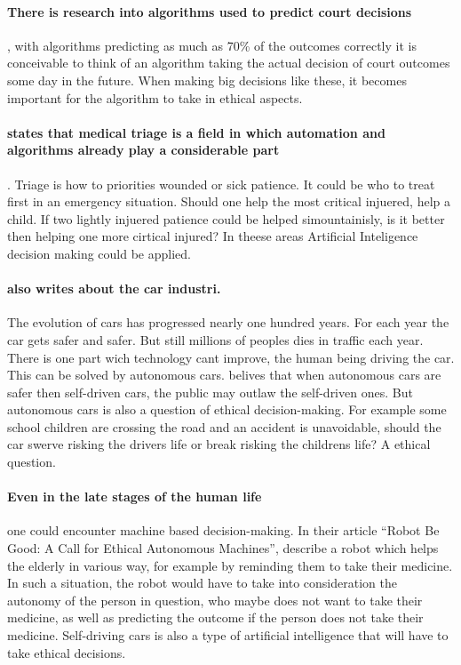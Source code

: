 \documentclass[11pt]{article}
\begin{document}
\paragraph{There is research into algorithms used to predict court decisions}
\cite{martin2004competing}, with algorithms predicting as much
as 70\% of the outcomes correctly \cite{Kravets2014Court} it is
conceivable to think of an algorithm taking the actual decision of court
outcomes some day in the future. When making big decisions like these, it
becomes important for the algorithm to take in ethical aspects.

\paragraph{ states that medical triage is a field in which automation and algorithms already play a considerable part}. Triage is how to priorities wounded or sick patience. It could be who to treat first in an emergency situation. Should one help the most critical injuered, help a child. If two lightly injuered patience could be helped simountainisly, is it better then helping one more cirtical injured? In theese areas Artificial Inteligence decision making could be applied.

\paragraph{\citeauthor{Chatfield2014automate} also writes about the car industri.} The evolution of cars has progressed nearly one hundred years. For each year the car gets safer and safer. But still millions of peoples dies in traffic each year. There is one part wich technology cant improve, the human being driving the car. This can be solved by autonomous cars. \citeauthor{elonmuskTweet} belives that when autonomous cars are safer then self-driven cars, the public may outlaw the self-driven ones. But autonomous cars is also a question of ethical decision-making. For example some school children are crossing the road and an accident is unavoidable, should the car swerve risking the drivers life or break risking the childrens life? A ethical question.

\paragraph{Even in the late stages of the human life} one could encounter machine based decision-making. In their article “Robot Be Good: A Call for Ethical Autonomous
Machines”, \citeauthor{anderson2010robot} describe a robot which
helps the elderly in various way, for example by reminding them to take their
medicine. In such a situation, the robot would have to take into consideration
the autonomy of the person in question, who maybe does not want to take their
medicine, as well as predicting the outcome if the person does not take their
medicine. Self-driving cars is also a type of artificial intelligence that will
have to take ethical decisions.
\end{document}

